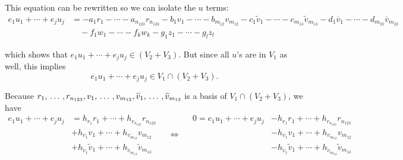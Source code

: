 \begin{xrcs}
%
This equation can be rewritten so we can isolate the $u$ terms:
\[
\begin{aligned}
  e_{1} u_1 + \cdots + e_j u_j &= - a_1r_1 -  \cdots - a_{n_{123}} r_{n_{123}} - b_1v_1 -  \cdots - b_{m_{12}} v_{m_{12}} -  c_1\widetilde{v}_1 - \cdots - c_{m_{13}}\widetilde{v}_{m_{13}} - d_{1}\overline{v}_1 - \cdots - d_{m_{23}}\overline{v}_{m_{23}} \\
  & \quad - f_1 w_1 - \cdots - f_k w_k - g_1 z_1 - \cdots - g_l z_l
\end{aligned}
\]

which shows that $e_{1} u_1 + \cdots + e_j u_j \in (V_2 + V_3)$. But since all $u$'s are in $V_1$ as well, this implies
\[ e_{1} u_1 + \cdots + e_j u_j \in V_1 \cap (V_2 + V_3).\]


Because $r_{1}, {\, \ldots \,\,}, r_{n_{123}}, v_{1}, {\, \ldots \,\,}, v_{m_{12}}, \widetilde{v}_1, {\, \ldots \,\,}, \widetilde{v}_{m_{13}}$ is a basis of $V_1 \cap (V_2+V_3)$, we have
\begin{equation}
  \label{eq: equation for u}
  \begin{aligned}
  e_{1} u_1 + \cdots + e_j u_j &= h_{r_{1}} r_{1} + \cdots + h_{r_{n_{123}}} r_{n_{123}} \\
  &  + h_{v_{1}} v_{1} + \cdots + h_{v_{m_{12}}} v_{m_{12}} \\
  &  + h_{\widetilde{v}_1} \widetilde{v}_1 + \cdots + h_{\widetilde{v}_{m_{13}}} \widetilde{v}_{m_{13}}
  \end{aligned}
  \quad \iff \quad
  \begin{aligned}
  0 = e_{1} u_1 + \cdots + e_j u_j &- h_{r_{1}} r_{1} + \cdots + h_{r_{n_{123}}} r_{n_{123}} \\
  &  - h_{v_{1}} v_{1} + \cdots + h_{v_{m_{12}}} v_{m_{12}} \\
  &  - h_{\widetilde{v}_1} \widetilde{v}_1 + \cdots + h_{\widetilde{v}_{m_{13}}} \widetilde{v}_{m_{13}}
  \end{aligned}
\end{equation}


\end{xrcs}
